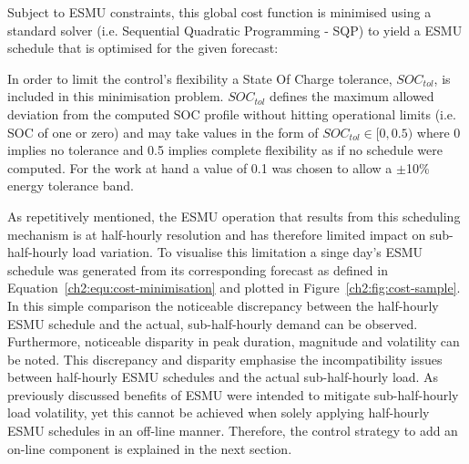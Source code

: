 

Subject to ESMU constraints, this global cost function is minimised using a standard solver (i.e. Sequential Quadratic Programming - SQP) to yield a ESMU schedule that is optimised for the given forecast:



In order to limit the control's flexibility a State Of Charge tolerance, $SOC_{tol}$, is included in this minimisation problem.
$SOC_{tol}$ defines the maximum allowed deviation from the computed SOC profile without hitting operational limits (i.e. SOC of one or zero) and may take values in the form of $SOC_{tol} \in [0, 0.5)$ where 0 implies no tolerance and 0.5 implies complete flexibility as if no schedule were computed.
For the work at hand a value of 0.1 was chosen to allow a $\pm$10\% energy tolerance band.



As repetitively mentioned, the ESMU operation that results from this scheduling mechanism is at half-hourly resolution and has therefore limited impact on sub-half-hourly load variation.
To visualise this limitation a singe day's ESMU schedule was generated from its corresponding forecast as defined in Equation~\ref{ch2:equ:cost-minimisation} and plotted in Figure~\ref{ch2:fig:cost-sample}.
In this simple comparison the noticeable discrepancy between the half-hourly ESMU schedule and the actual, sub-half-hourly demand can be observed.
Furthermore, noticeable disparity in peak duration, magnitude and volatility can be noted.
This discrepancy and disparity emphasise the incompatibility issues between half-hourly ESMU schedules and the actual sub-half-hourly load.
As previously discussed benefits of ESMU were intended to mitigate sub-half-hourly load volatility, yet this cannot be achieved when solely applying half-hourly ESMU schedules in an off-line manner.
Therefore, the control strategy to add an on-line component is explained in the next section.
